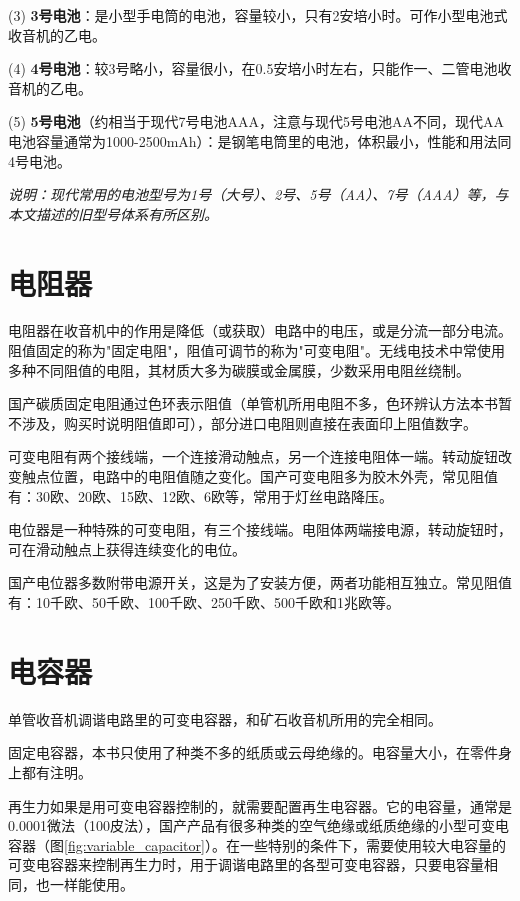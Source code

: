 \documentclass[12pt,UTF8]{ctexbook}
\begin{document}
(3) \textbf{3号电池}：是小型手电筒的电池，容量较小，只有2安培小时。可作小型电池式收音机的乙电。

(4) \textbf{4号电池}：较3号略小，容量很小，在0.5安培小时左右，只能作一、二管电池收音机的乙电。

(5) \textbf{5号电池}（约相当于现代7号电池AAA，注意与现代5号电池AA不同，现代AA电池容量通常为1000-2500mAh）：是钢笔电筒里的电池，体积最小，性能和用法同4号电池。

\textit{说明：现代常用的电池型号为1号（大号）、2号、5号（AA）、7号（AAA）等，与本文描述的旧型号体系有所区别。}

\section{电阻器}

电阻器在收音机中的作用是降低（或获取）电路中的电压，或是分流一部分电流。阻值固定的称为"固定电阻"，阻值可调节的称为"可变电阻"。无线电技术中常使用多种不同阻值的电阻，其材质大多为碳膜或金属膜，少数采用电阻丝绕制。

国产碳质固定电阻通过色环表示阻值（单管机所用电阻不多，色环辨认方法本书暂不涉及，购买时说明阻值即可），部分进口电阻则直接在表面印上阻值数字。

可变电阻有两个接线端，一个连接滑动触点，另一个连接电阻体一端。转动旋钮改变触点位置，电路中的电阻值随之变化。国产可变电阻多为胶木外壳，常见阻值有：30欧、20欧、15欧、12欧、6欧等，常用于灯丝电路降压。

电位器是一种特殊的可变电阻，有三个接线端。电阻体两端接电源，转动旋钮时，可在滑动触点上获得连续变化的电位。

国产电位器多数附带电源开关，这是为了安装方便，两者功能相互独立。常见阻值有：10千欧、50千欧、100千欧、250千欧、500千欧和1兆欧等。

\section{电容器}

单管收音机调谐电路里的可变电容器，和矿石收音机所用的完全相同。

固定电容器，本书只使用了种类不多的纸质或云母绝缘的。电容量大小，在零件身上都有注明。

再生力如果是用可变电容器控制的，就需要配置再生电容器。它的电容量，通常是0.0001微法（100皮法），国产产品有很多种类的空气绝缘或纸质绝缘的小型可变电容器（图\ref{fig:variable_capacitor}）。在一些特别的条件下，需要使用较大电容量的可变电容器来控制再生力时，用于调谐电路里的各型可变电容器，只要电容量相同，也一样能使用。
\end{document}
